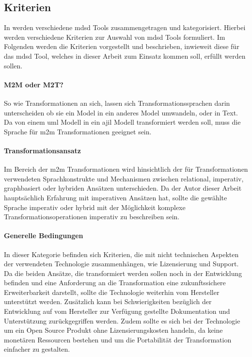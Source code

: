 \documentclass[
	oneside,  %
	ngerman, 
	final, 
	11pt, 
	a4paper, 
	1.1headlines, 
	headinclude=false, 
	footinclude=false, 
	mpinclude=false, 
	pagesize, 
	onecolumn, 
	titlepage, 
	parskip=half, 
	headsepline, 
	chapterprefix=false, 
	version=first, 
	listof=totoc, 
	bibliography=totoc, 
	toc=graduated, 
	fleqn
]{scrbook}
\begin{document}
\subsection{Kriterien}
In \cite{MDEToolEvaluation} werden verschiedene \ac{mdsd} Tools zusammengetragen und kategorisiert. Hierbei werden verschiedene Kriterien zur Auswahl von \ac{mdsd} Tools formuliert. Im Folgenden werden die Kriterien vorgestellt und beschrieben, inwieweit diese für das \ac{mdsd} Tool, welches in dieser Arbeit zum Einsatz kommen soll, erfüllt werden sollen.
\paragraph{M2M oder M2T?} 
So wie Transformationen an sich, lassen sich Transformationssprachen darin unterscheiden ob sie ein Model in ein anderes Model umwandeln, oder in Text. Da von einem \ac{uml} Modell in ein \ac{ajil} Modell transformiert werden soll, muss die Sprache für \ac{m2m} Transformationen geeignet sein.
\paragraph{Transformationsansatz} 
Im Bereich der \ac{m2m} Transformationen wird hinsichtlich der für Transformationen verwendeten Sprachkonstrukte und Mechanismen zwischen relational, imperativ, graphbasiert oder hybriden Ansätzen unterschieden. Da der Autor dieser Arbeit hauptsächlich Erfahrung mit imperativen Ansätzen hat, sollte die gewählte Sprache imperativ oder hybrid mit der Möglichkeit komplexe Transformationsoperationen imperativ zu beschreiben sein.
\paragraph{Generelle Bedingungen} 
In dieser Kategorie befinden sich Kriterien, die mit nicht technischen Aspekten der verwendeten Technologie zusammenhängen, wie Lizensierung und Support. Da die beiden Ansätze, die transformiert werden sollen noch in der Entwicklung befinden und eine Anforderung an die Transformation eine zukunftssichere Erweiterbarkeit darstellt, sollte die Technologie weiterhin vom Hersteller unterstützt werden. Zusätzlich kann bei Schwierigkeiten bezüglich der Entwicklung auf vom Hersteller zur Verfügung gestellte Dokumentation und Unterstützung zurückgegriffen werden. Zudem sollte es sich bei der Technologie um ein Open Source Produkt ohne Lizensierungskosten handeln, da keine monetären Ressourcen bestehen und um die Portabilität der Transformation einfacher zu gestalten.
\end{document}

